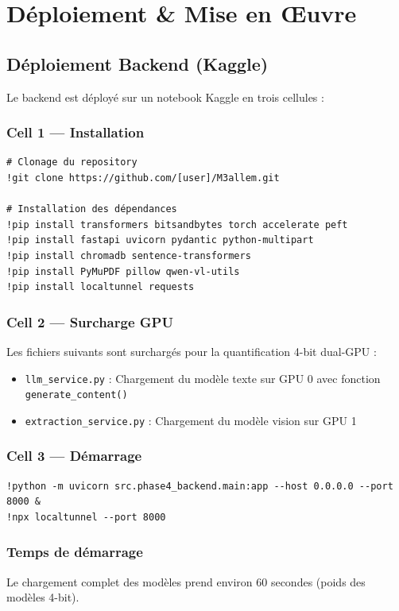 \documentclass[12pt,a4paper]{report}
\begin{document}
\chapter{Déploiement \& Mise en Œuvre}

\section{Déploiement Backend (Kaggle)}
Le backend est déployé sur un notebook Kaggle en trois cellules :

\subsection{Cell 1 — Installation}
\begin{lstlisting}
# Clonage du repository
!git clone https://github.com/[user]/M3allem.git

# Installation des dépendances
!pip install transformers bitsandbytes torch accelerate peft
!pip install fastapi uvicorn pydantic python-multipart
!pip install chromadb sentence-transformers
!pip install PyMuPDF pillow qwen-vl-utils
!pip install localtunnel requests
\end{lstlisting}

\subsection{Cell 2 — Surcharge GPU}
Les fichiers suivants sont surchargés pour la quantification 4-bit dual-GPU :
\begin{itemize}
    \item \texttt{llm\_service.py} : Chargement du modèle texte sur GPU 0 avec fonction \texttt{generate\_content()}
    \item \texttt{extraction\_service.py} : Chargement du modèle vision sur GPU 1
\end{itemize}

\subsection{Cell 3 — Démarrage}
\begin{lstlisting}
!python -m uvicorn src.phase4_backend.main:app --host 0.0.0.0 --port 8000 &
!npx localtunnel --port 8000
\end{lstlisting}

\subsection{Temps de démarrage}
Le chargement complet des modèles prend environ 60 secondes (poids des modèles 4-bit).
\end{document}
